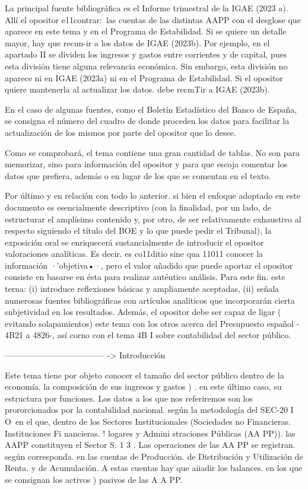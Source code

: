 \documentclass[10pt,a4paper]{article}
\begin{document}
La principal fuente bibliográfica es el Informe trimestral de la IGAE (2023 a). Allí el opositor e11contrar:\ las cuentas de las distintas AAPP con el desglose que aparece en este tema y en el Programa de Estabilidad. Si se quiere un detalle mayor, hay que recun-ir a los datos de IGAE (2023b). Por ejemplo, en el apartado II se dividen los ingresos y gastos entre corrientes y de capital, pues esta división tiene alguna relevancia económica. Sin embargo, esta división no aparece ni en IGAE (2023a) ni en el Programa de Estabilidad. Si el opositor quiere mantenerla al actualizar los datos. debe recmTir a IGAE (2023b).

En el caso de algunas fuentes, como el Boletín Estadístico del Banco de España, se consigna el número del cuadro de donde proceden los datos para facilitar la actualización de los mismos por parte del opositor que lo desee.

Como se comprobará, el tema contiene una gran cantidad de tablas. No son para memorizar, sino para información del opositor y para que escoja comentar los datos que prefiera, además o en lugar de los que se comentan en el texto.

Por último y en relación con todo lo anterior. si bien el enfoque adoptado en este documento es esencialmente descriptivo (con la finalidad, por un lado, de estructurar el amplísimo contenido y, por otro, de ser relativamente exhaustivo al respecto siguiendo el título del BOE y lo que puede pedir el Tribunal), la exposición oral se enriquecerá sustancialmente de introducir el opositor valoraciones analíticas. Es decir. es co11ditio sine qua 11011 conocer la información ·'objetiva•·, pero el valor añadido que puede aportar el opositor consiste en basarse en ésta para realizar auténtico análisis. Para este fin. este terna: (i) introduce reflexiones básicas y ampliamente aceptadas, (ii) señala numerosas fuentes bibliográficas con artículos analíticos que incorporarán cierta subjetividad en los resultados. Además, el opositor debe ser capaz de ligar ( evitando solapamientos) este tema con los otros acerca del Presupuesto español - 4B21 a 4826-, así corno con el tema 4B I sobre contabilidad del sector público.


------------------------------------ -> Introducción

Este tema tiene por objeto conocer el tamaño del sector público dentro de la economía. la composición de sus ingresos y gastos ) . en este último caso, su estructura por funciones. Los datos a los que nos referiremos son los prororcionados por la contabilidad nacional. según la metodología del SEC-20 I O\ en el que, dentro de los Sectores Institucionales (Sociedades no Financieras. Instituciones Fi nancieras. ! logares y Admini straciones Públicas (AA PP)). las AAPP constituyen el Sector S. 1 3 . Las operaciones de las AA PP se registran. según corresponda. en las cuentas de Producción. de Distribución y Utilización de Renta. y de Acumulación. A estas cuentas hay que aiiadir los balances. en los que se consignan los activos ) pasivos de las A A PP.
\end{document}
